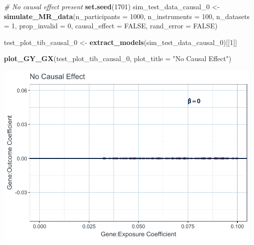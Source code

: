 \documentclass[
]{article}
\newenvironment{Shaded}{\begin{snugshade}}{\end{snugshade}}
\newcommand{\AttributeTok}[1]{\textcolor[rgb]{0.13,0.29,0.53}{#1}}
\newcommand{\CommentTok}[1]{\textcolor[rgb]{0.56,0.35,0.01}{\textit{#1}}}
\newcommand{\ConstantTok}[1]{\textcolor[rgb]{0.56,0.35,0.01}{#1}}
\newcommand{\DecValTok}[1]{\textcolor[rgb]{0.00,0.00,0.81}{#1}}
\newcommand{\FunctionTok}[1]{\textcolor[rgb]{0.13,0.29,0.53}{\textbf{#1}}}
\newcommand{\NormalTok}[1]{#1}
\newcommand{\OtherTok}[1]{\textcolor[rgb]{0.56,0.35,0.01}{#1}}
\newcommand{\StringTok}[1]{\textcolor[rgb]{0.31,0.60,0.02}{#1}}
\begin{document}
\begin{Shaded}
\begin{Highlighting}[]
\CommentTok{\# No causal effect present}
 \FunctionTok{set.seed}\NormalTok{(}\DecValTok{1701}\NormalTok{)}
\NormalTok{ sim\_test\_data\_causal\_0 }\OtherTok{\textless{}{-}} \FunctionTok{simulate\_MR\_data}\NormalTok{(}\AttributeTok{n\_participants =} \DecValTok{1000}\NormalTok{,}
                                            \AttributeTok{n\_instruments =} \DecValTok{100}\NormalTok{,}
                                            \AttributeTok{n\_datasets =} \DecValTok{1}\NormalTok{,}
                                            \AttributeTok{prop\_invalid =} \DecValTok{0}\NormalTok{,}
                                            \AttributeTok{causal\_effect =} \ConstantTok{FALSE}\NormalTok{,}
                                            \AttributeTok{rand\_error =} \ConstantTok{FALSE}\NormalTok{)}

\NormalTok{ test\_plot\_tib\_causal\_0 }\OtherTok{\textless{}{-}} \FunctionTok{extract\_models}\NormalTok{(sim\_test\_data\_causal\_0)[[}\DecValTok{1}\NormalTok{]]}

 \FunctionTok{plot\_GY\_GX}\NormalTok{(test\_plot\_tib\_causal\_0, }\AttributeTok{plot\_title =} \StringTok{"No Causal Effect"}\NormalTok{)}
\end{Highlighting}
\end{Shaded}

\includegraphics{9_Test_Appendices_files/figure-latex/test-plot-no-causal-1.pdf}
\end{document}
